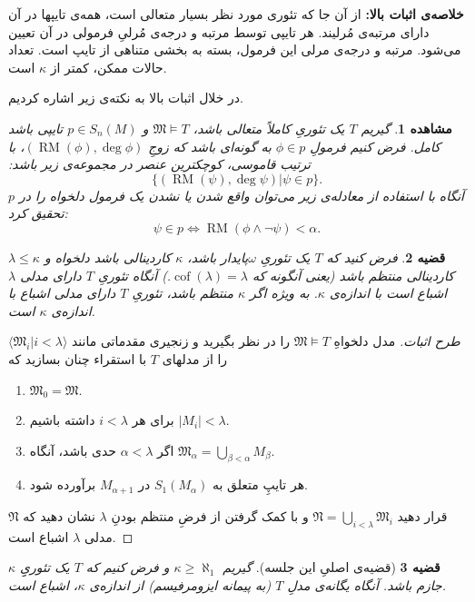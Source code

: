 \documentclass[12pt,a4paper]{report}
\theoremstyle{colorhead}
\newtheorem{thm}{قضیه}
\newtheorem{moshahede}[thm]{مشاهده}
\DeclareMathOperator{\RM}{RM}
\DeclareMathOperator{\cof}{cof}
\begin{document}
\begin{framed}
\textbf{خلاصه‌ی اثبات بالا:}
از آن جا که تئوری مورد نظر
بسیار متعالی است، همه‌‌ی تایپها
در آن
 دارای مرتبه‌ی مُرلیند. هر تایپی توسط مرتبه‌ و درجه‌ی مُرلیِ فرمولی در آن
تعیین می‌شود. مرتبه‌ و درجه‌ی مرلی این فرمول، بسته‌ به بخشی متناهی از تایپ است. تعداد حالات ممکن، کمتر از
$\kappa$
است.
\end{framed}
در خلال اثبات بالا به نکته‌ی زیر اشاره کردیم.
\begin{moshahede}
	گیریم
	$T$
	یک تئوریِ کاملاً متعالی باشد،
$\mathfrak{M}\models T$
	  و
	$p\in S_n(M)$
	تایپی  باشد 
	کامل. فرض کنیم فرمولِ
	$\phi\in p$
	به گونه‌ای باشد که زوجِ
	$(\RM(\phi),\deg \phi)$،
	با ترتیب قاموسی، کوچکترین عنصر در مجموعه‌ی زیر باشد:
	\[
\{	(\RM(\psi),\deg \psi)|\psi\in p\}.
	\]
آنگاه با استفاده از معادله‌ی زیر می‌توان واقع شدن یا نشدن یک فرمول دلخواه را در
$p$
تحقیق کرد:
\[
\psi\in p\Leftrightarrow \RM(\phi\wedge\neg \psi)<\alpha.
\]
	\end{moshahede}
\begin{thm}
	فرض  کنید که
	$T$
یک تئوریِ
$\omega$پایدار 
باشد، 
$\kappa$
کاردینالی باشد دلخواه  و
$\lambda\leq \kappa$
کاردینالی منتظم باشد (یعنی آنگونه که 
$\cof(\lambda)=\lambda$.)
آنگاه تئوریِ
$T$
دارای مدلی 
$\lambda$اشباع
 است با اندازه‌ی
$\kappa$.
به ويژه اگر
$\kappa$
منتظم باشد، تئوریِ
$T$
دارای مدلی اشباع با اندازه‌ی
$\kappa$
است.
	\end{thm}
\begin{proof}[طرح اثبات]
	مدل دلخواهِ
	$\mathfrak{M}\models T$
	را در نظر بگیرید و زنجیری مقدماتی مانند
	$\langle \mathfrak{M}_i|i<\lambda\rangle$
	را از مدلهای 
	$T$
	با استقراء چنان بسازید که 
	\begin{enumerate}
\item 
$\mathfrak{M}_0=\mathfrak{M}$.
		\item 
		برای هر 
		$i<\lambda$
		داشته باشیم
		$|M_i|<\lambda$.
		\item 
		اگر
		$\alpha<\lambda$
		حدی باشد، آنگاه
		$\mathfrak{M}_\alpha=\bigcup_{\beta<\alpha}M_\beta$.
		\item 
		هر تایپِ متعلق به
		$S_1(M_\alpha)$
		در
		$M_{\alpha+1}$
		برآورده شود.
\end{enumerate}
قرار دهید
$\mathfrak{N}=\bigcup_{i<\lambda} \mathfrak{M}_i$
و با کمک گرفتن از فرضِ منتظم بودنِ
$\lambda$
نشان دهید که
$\mathfrak{N}$
مدلی
$\lambda$
اشباع است.
	\end{proof}
\begin{thm}[قضیه‌ی اصلیِ این جلسه]
	گیریم
	$\kappa\geq \aleph_1$
	و فرض کنیم که 
	$T$
	یک
	تئوریِِ
	$\kappa$	جازم
	  باشد. آنگاه یگانه‌ی مدلِ
	$T$
	(به پیمانه ایزومرفیسم) از اندازه‌ی
$\kappa$،
اشباع است.
	\end{thm}
\end{document}
